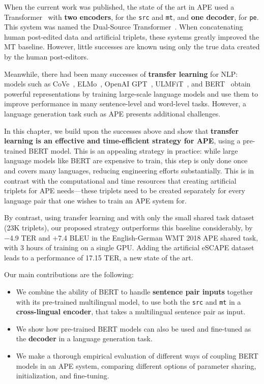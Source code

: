 When the current work was published, the state of the art in APE used
a Transformer~\citep{vaswani2017attention} with {\bf two encoders},
for the {\tt src} and {\tt mt}, and {\bf one decoder}, for {\tt pe}.
This system was named the Dual-Source
Transformer~\citep{junczys2018ms, tebbifakhr2018multi}. When
concatenating human post-edited data and artificial triplets, these
systems greatly improved the MT baseline. However, little successes
are known using only the true data created by the human post-editors.

Meanwhile, there had been many successes of {\bf transfer learning}
for NLP: models such as CoVe~\citep{mccann2017learned},
ELMo~\citep{peters2018deep}, OpenAI GPT~\citep{radford2018improving},
ULMFiT~\citep{howard2018universal}, and BERT~\citep{devlin2018bert}
obtain powerful representations by training large-scale language
models and use them to improve performance in many sentence-level and
word-level tasks. However, a language generation task such as APE
presents additional challenges.

In this chapter, we build upon the successes above and show that {\bf
    transfer learning is an effective and time-efficient strategy for
    APE}, using a pre-trained BERT model. This is an appealing strategy
in practice: while large language models like BERT are expensive to
train, this step is only done once and covers many languages,
reducing engineering efforts substantially. This is in contrast with
the computational and time resources that creating artificial
triplets for APE needs---these triplets need to be created separately
for every language pair that one wishes to train an APE system for.

By contrast, using transfer learning and with only the small shared
task dataset (23K triplets), our proposed strategy outperforms this
baseline considerably, by $-$4.9 TER and $+$7.4 BLEU in the
English-German WMT 2018 APE shared task, with 3 hours of training on
a single GPU. Adding the artificial eSCAPE
dataset~\citep{negri2018escape} leads to a performance of 17.15 TER,
a new state of the art.

Our main contributions are the following:
\begin{itemize}
  \item We combine the ability of BERT to
        handle {\bf sentence pair inputs} together with its pre-trained
        multilingual model, to use both the {\tt src} and {\tt mt} in a
          {\bf cross-lingual encoder}, that takes a multilingual
        sentence pair as input.
  \item We show how pre-trained BERT models can also be used and
        fine-tuned as the {\bf decoder} in a language generation task.
  \item We make a thorough empirical evaluation of different ways of
        coupling BERT models in an APE system, comparing different options
        of parameter sharing, initialization, and fine-tuning.
\end{itemize}


